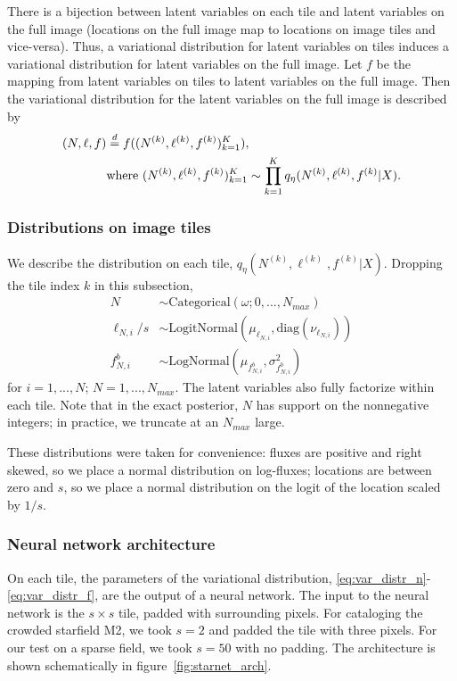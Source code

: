 There is a bijection between latent variables on each tile and latent variables on the full image (locations on the full image map to locations on image tiles and vice-versa). Thus, a variational distribution for latent variables on tiles induces a variational distribution for latent variables on the full image. Let $f$ be the mapping from latent variables on tiles to latent variables on the full image. Then the variational distribution for the latent variables on the full image is described by 
\begin{align}
    (N, \ell, f) &\stackrel{d}{=} f((N^{(k)}, \ell^{(k)}, f^{(k)})_{k = 1}^K), \notag \\  
        &\text{where } (N^{(k)}, \ell^{(k)}, f^{(k)})_{k = 1}^K \sim \prod_{k = 1}^K q_\eta(N^{(k)}, \ell^{(k)}, f^{(k)} | X). 
\end{align}

\subsubsection{Distributions on image tiles}
We describe the distribution on each tile, $q_\eta(N^{(k)}, \ell^{(k)}, f^{(k)} | X)$. 
Dropping the tile index $k$ in this subsection,
\begin{align}
    N &\sim \text{Categorical}(\omega; 0, ..., N_{max}) \label{eq:var_distr_n}\\
	\ell_{N, i} / s &\sim \text{LogitNormal}(\mu_{\ell_{N, i}}, \text{diag}(\nu_{\ell_{N, i}}) )\label{eq:var_distr_loc}\\
	f^b_{N, i} &\sim \text{LogNormal}(\mu_{f^b_{N, i}}, \sigma^2_{f^b_{N, i}}) \label{eq:var_distr_f}
\end{align}
for $i = 1, ..., N$; $N = 1, ..., N_{max}$. The latent variables also fully factorize within each tile. Note that in the exact posterior, $N$ has support on the nonnegative integers; in practice, we truncate at an $N_{max}$ large. 

These distributions were taken for convenience: fluxes are positive and right skewed, so we place a normal distribution on log-fluxes; locations are between zero and $s$, so 
we place a normal distribution on the logit of the location scaled by $1 / s$. 

\subsubsection{Neural network architecture}
On each tile, the parameters of the variational distribution, \eqref{eq:var_distr_n}-\eqref{eq:var_distr_f}, are the output of a neural network. The input to the neural network is the $s \times s$ tile, padded with surrounding pixels. 
For cataloging the crowded starfield M2,
we took $s = 2$ and padded the tile with three pixels. 
For our test on a sparse field, we took $s = 50$ with no padding. 
The architecture is shown schematically in figure~\ref{fig:starnet_arch}. 

